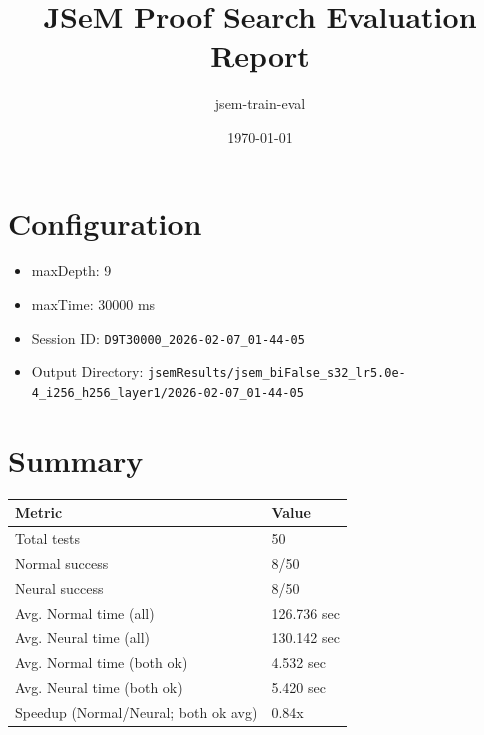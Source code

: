 \documentclass[a4paper,10pt]{article}
\title{JSeM Proof Search Evaluation Report}
\author{jsem-train-eval}
\date{\today}
\begin{document}
\maketitle

\section{Configuration}
\begin{itemize}
\item maxDepth: 9
\item maxTime: 30000 ms
\item Session ID: \texttt{D9T30000\_2026-02-07\_01-44-05}
\item Output Directory: \texttt{jsemResults/jsem\_biFalse\_s32\_lr5.0e-4\_i256\_h256\_layer1/2026-02-07\_01-44-05}
\end{itemize}

\section{Summary}
\begin{tabular}{ll}
\toprule
\textbf{Metric} & \textbf{Value} \\
\midrule
Total tests & 50 \\
Normal success & 8/50 \\
Neural success & 8/50 \\
\midrule
Avg. Normal time (all) & 126.736 sec \\
Avg. Neural time (all) & 130.142 sec \\
Avg. Normal time (both ok) & 4.532 sec \\
Avg. Neural time (both ok) & 5.420 sec \\
Speedup (Normal/Neural; both ok avg) & 0.84x \\
\bottomrule
\end{tabular}
\end{document}
